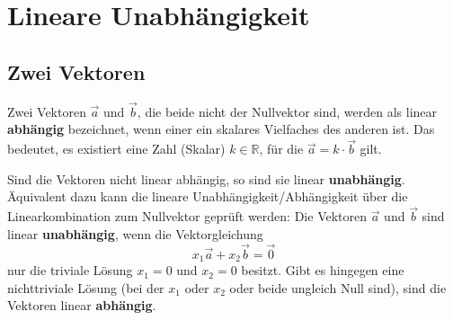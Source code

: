 \chapter{Lineare Unabhängigkeit}

\section{Zwei Vektoren}

Zwei Vektoren $\vec{a}$ und $\vec{b}$, die beide nicht der Nullvektor sind,
werden als linear \textbf{abhängig} bezeichnet, wenn einer ein skalares
Vielfaches des anderen ist. Das bedeutet, es existiert eine Zahl (Skalar) $k
    \in \mathbb{R}$, für die $\vec{a} = k \cdot \vec{b}$ gilt.

Sind die Vektoren nicht linear abhängig, so sind sie linear
\textbf{unabhängig}. Äquivalent dazu kann die lineare
Unabhängigkeit/Abhängigkeit über die Linearkombination zum Nullvektor geprüft
werden: Die Vektoren $\vec{a}$ und $\vec{b}$ sind linear \textbf{unabhängig},
wenn die Vektorgleichung
\[ x_1 \vec{a} + x_2 \vec{b} = \vec{0} \]
nur die triviale Lösung $x_1 = 0$ und $x_2 = 0$ besitzt. Gibt es hingegen eine
nichttriviale Lösung (bei der $x_1$ oder $x_2$ oder beide ungleich Null sind),
sind die Vektoren linear \textbf{abhängig}.

